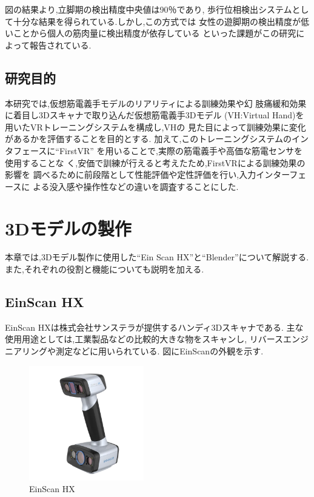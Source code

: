 \documentclass{ltjsreport}
\begin{document}
		図の結果より,立脚期の検出精度中央値は90％であり,
		歩行位相検出システムとして十分な結果を得られている.しかし,この方式では
		女性の遊脚期の検出精度が低いことから個人の筋肉量に検出精度が依存している
		といった課題がこの研究によって報告されている.

		\section{研究目的}
		本研究では,仮想筋電義手モデルのリアリティによる訓練効果や幻
		肢痛緩和効果に着目し3Dスキャナで取り込んだ仮想筋電義手3Dモデル
		(VH:Virtual Hand)を用いたVRトレーニングシステムを構成し,VHの
		見た目によって訓練効果に変化があるかを評価することを目的とする.
		加えて,このトレーニングシステムのインタフェースに``FirstVR''\cite{ref:5}
		を用いることで,実際の筋電義手や高価な筋電センサを使用することな
		く,安価で訓練が行えると考えたため,FirstVRによる訓練効果の影響を
		調べるために前段階として性能評価や定性評価を行い,入力インターフェースに
		よる没入感や操作性などの違いを調査することにした.


\chapter{3Dモデルの製作}
	本章では,3Dモデル製作に使用した``Ein Scan HX''と``Blender''について解説する.
	また,それぞれの役割と機能についても説明を加える.

	\section{EinScan HX}
		EinScan HXは株式会社サンステラが提供するハンディ3Dスキャナである.
		主な使用用途としては,工業製品などの比較的大きな物をスキャンし,
		リバースエンジニアリングや測定などに用いられている.
		図にEinScanの外観を示す.

		\begin{figure}[H]
		\centering
		\includegraphics[width = 5cm]{../figs/EinScan.png}
		\caption{EinScan HX}
		\label{fig:EinScan}
		\end{figure}
\vspace{-15pt}
\end{document}
